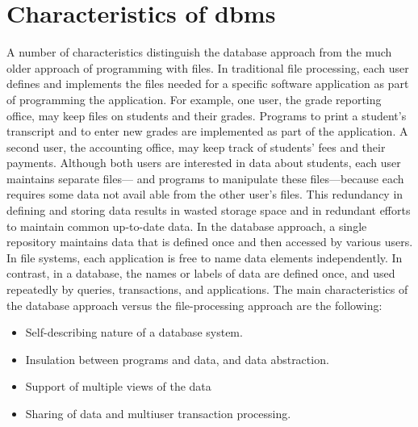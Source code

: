 \thispagestyle{fancy}
\pagebreak

\thispagestyle{fancy}

\section{Characteristics of dbms }
A number of characteristics distinguish the database approach from the much older approach of programming with files. In traditional file processing, each user defines and implements the files needed for a specific software application as part of programming the application. For example, one user, the grade reporting office, may keep files on students and their grades. Programs to print a student’s transcript and to enter new grades are implemented as part of the application. A second user, the accounting office, may keep track of students’ fees and their payments. Although both users are interested in data about students, each user maintains separate files— and programs to manipulate these files—because each requires some data not avail able from the other user’s files. This redundancy in defining and storing data results in wasted storage space and in redundant efforts to maintain common up-to-date data. In the database approach, a single repository maintains data that is defined once and then accessed by various users. In file systems, each application is free to name data elements independently. In contrast, in a database, the names or labels of data are defined once, and used repeatedly by queries, transactions, and applications. The main characteristics of the database approach versus the file-processing approach are the following:\\
\begin{itemize}
\item \textbf{} Self-describing nature of a database system.
\item \textbf{} Insulation between programs and data, and data abstraction. 
\item \textbf{} Support of multiple views of the data
\item \textbf{} Sharing of data and multiuser transaction processing.
\end{itemize}

